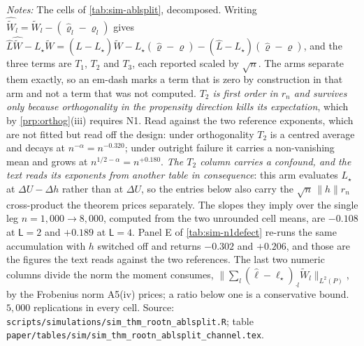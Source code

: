 \documentclass[
  12pt]{article}
\newcommand{\1}[1]{\mathds{1}\left[#1\right]}
\theoremstyle{plain}
\theoremstyle{definition}
\theoremstyle{definition}
\theoremstyle{remark}
\begin{document}
\begin{table}[!htbp]
\centering
\begin{threeparttable}
\caption{The instrument block, term by term, and the two norms A5(iv) separates}
\label{tab:sim-ablsplit-channel}
\footnotesize
\setlength{\tabcolsep}{4pt}

\begin{tablenotes}\footnotesize
\item \textit{Notes:} The cells of \cref{tab:sim-ablsplit}, decomposed. Writing
$\hat{\widetilde W}_l=\widetilde W_l-(\hat\varrho_l-\varrho_l)$ gives
$\hat L\hat{\widetilde W}-L_\star\widetilde W
 =(\hat L-L_\star)\widetilde W-L_\star(\hat\varrho-\varrho)
 -(\hat L-L_\star)(\hat\varrho-\varrho)$, and the three terms are $T_1$, $T_2$
and $T_3$, each reported scaled by $\sqrt n$. The arms separate them exactly, so
an em-dash marks a term that is zero by construction in that arm and not a term
that was not computed. \emph{$T_2$ is first order in $r_n$ and survives only
because orthogonality in the propensity direction kills its expectation}, which
by \cref{prp:orthog}\textup{(iii)} requires N1. Read against the two reference
exponents, which are not fitted but read off the design: under orthogonality
$T_2$ is a centred average and decays at $n^{-\alpha}=n^{-0.320}$; under outright
failure it carries a non-vanishing mean and grows at
$n^{1/2-\alpha}=n^{+0.180}$. \emph{The $T_2$ column carries a confound, and the
text reads its exponents from another table in consequence}: this arm evaluates
$L_\star$ at $\Delta U-\Delta h$ rather than at $\Delta U$, so the entries below
also carry the $\sqrt n\,\|h\|r_n$ cross-product the theorem prices separately.
The slopes they imply over the single leg $n=1{,}000\to8{,}000$, computed from
the two unrounded cell means, are $-0.108$ at $\mathsf L=2$ and $+0.189$ at
$\mathsf L=4$. Panel E of \cref{tab:sim-n1defect} re-runs the same accumulation
with $h$ switched off and returns $-0.302$ and $+0.206$, and those are the
figures the text reads against the two references. The last two numeric columns
divide the norm the moment consumes, $\|\sum_l(\hat\ell-\ell_\star)_{\cdot l}
\widetilde W_l\|_{L^{2}(P)}$, by the Frobenius norm A5(iv) prices; a ratio below
one is a conservative bound. $5{,}000$ replications in every cell. Source:
\texttt{scripts/simulations/sim\_thm\_rootn\_ablsplit.R}; table
\texttt{paper/tables/sim/sim\_thm\_rootn\_ablsplit\_channel.tex}.
\end{tablenotes}
\end{threeparttable}
\end{table}
\end{document}
